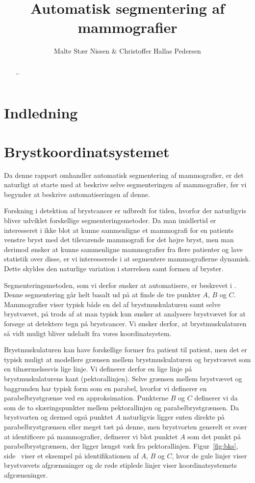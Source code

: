 \documentclass[11pt,a4paper]{article}
\title{Automatisk segmentering af mammografier}
\author{Malte Stær Nissen \& Christoffer Hallas Pedersen}
\begin{document}

\newpage
\clearpage
{}
\tableofcontents

\newpage

\begin{abstract}
\ldots
\end{abstract}

\newpage

\clearpage
{}

\section{Indledning}

\section{Brystkoordinatsystemet}
Da denne rapport omhandler automatisk segmentering af mammografier, er det naturligt at starte med at beskrive selve segmenteringen af mammografier, før vi begynder at beskrive automatiseringen af denne.

Forskning i detektion af brystcancer er udbredt for tiden, hvorfor der naturligvis bliver udviklet forskellige segmenteringsmetoder. Da man imidlertid er interesseret i ikke blot at kunne sammenligne et mammografi for en patients venstre bryst med det tilsvarende mammografi for det højre bryst, men man derimod ønsker at kunne sammenligne mammografier fra flere patienter og lave statistik over disse, er vi interesserede i at segmentere mammografierne dynamisk. Dette skyldes den naturlige variation i størrelsen samt formen af bryster.

Segmenteringsmetoden, som vi derfor ønsker at automatisere, er beskrevet i \cite{brandtetal}. Denne segmentering går helt basalt ud på at finde de tre punkter $A$, $B$ og $C$. Mammografier viser typisk både en del af brystmuskulaturen samt selve brystvævet, på trods af at man typisk kun ønsker at analysere brystvævet for at forsøge at detektere tegn på brystcancer. Vi ønsker derfor, at brystmuskulaturen så vidt muligt bliver udeladt fra vores koordinatsystem. 

Brystmuskulaturen kan have forskellige former fra patient til patient, men det er typisk muligt at modellere grænsen mellem brystmuskulaturen og brystvævet som en tilnærmelsesvis lige linje. Vi definerer derfor en lige linje på brystmuskulaturens kant (pektorallinjen). Selve grænsen mellem brystvævet og baggrunden har typisk form som en parabel, hvorfor vi definerer en parabelbrystgrænse ved en approksimation. Punkterne $B$ og $C$ definerer vi da som de to skæringspunkter mellem pektorallinjen og parabelbrystgrænsen. Da brystvorten og dermed også punktet $A$ naturligvis ligger enten direkte på parabelbrystgrænsen eller meget tæt på denne, men brystvorten generelt er svær at identificere på mammografier, definerer vi blot punktet $A$ som det punkt på parabelbrystgrænsen, der ligger længst væk fra pektorallinjen. Figur~\ref{fig:bks}, side~\pageref{fig:bks} viser et eksempel på identifikationen af $A$, $B$ og $C$, hvor de gule linjer viser brystvævets afgrænsninger og de røde stiplede linjer viser koordinatsystemets afgrænsninger.
\end{document}
